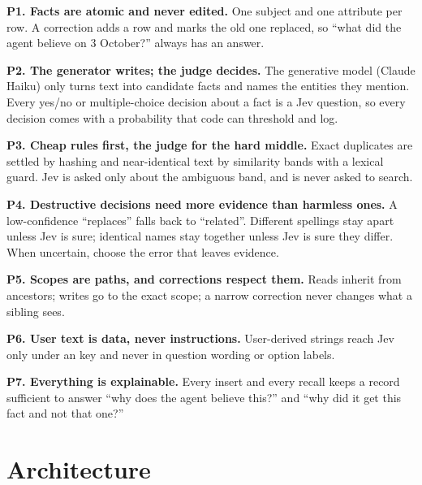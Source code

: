 \textbf{P1. Facts are atomic and never edited.} One subject and one attribute per row. A correction adds a row and marks
the old one replaced, so ``what did the agent believe on 3 October?'' always has an answer.

\textbf{P2. The generator writes; the judge decides.} The generative model (Claude Haiku) only turns text into
candidate facts and names the entities they mention. Every yes/no or multiple-choice decision about a fact is a Jev
question, so every decision comes with a probability that code can threshold and log.

\textbf{P3. Cheap rules first, the judge for the hard middle.} Exact duplicates are settled by hashing and
near-identical text by similarity bands with a lexical guard. Jev is asked only about the ambiguous band, and is never
asked to search.

\textbf{P4. Destructive decisions need more evidence than harmless ones.} A low-confidence ``replaces'' falls back to
``related''. Different spellings stay apart unless Jev is sure; identical names stay together unless Jev is sure they
differ. When uncertain, choose the error that leaves evidence.

\textbf{P5. Scopes are paths, and corrections respect them.} Reads inherit from ancestors; writes go to the exact
scope; a narrow correction never changes what a sibling sees.

\textbf{P6. User text is data, never instructions.} User-derived strings reach Jev only under an  key and
never in question wording or option labels.

\textbf{P7. Everything is explainable.} Every insert and every recall keeps a record sufficient to answer ``why does the
agent believe this?'' and ``why did it get this fact and not that one?''

\section{Architecture}\label{sec:arch}

